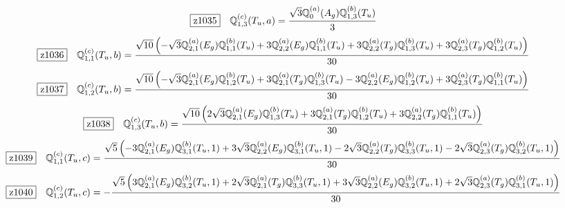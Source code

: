 \documentclass[fleqn,10pt,landscape]{jsarticle}
\begin{document}
\begin{dmath*}
\hspace*{3mm}\fbox{z1035}\quad \mathbb{Q}_{1,3}^{(c)}(T_{u},a)=\frac{\sqrt{3} \mathbb{Q}_{0}^{(a)}(A_{g}) \mathbb{Q}_{1,3}^{(b)}(T_{u})}{3}
\end{dmath*}
\begin{dmath*}
\hspace*{3mm}\fbox{z1036}\quad \mathbb{Q}_{1,1}^{(c)}(T_{u},b)=\frac{\sqrt{10} \left(- \sqrt{3} \mathbb{Q}_{2,1}^{(a)}(E_{g}) \mathbb{Q}_{1,1}^{(b)}(T_{u}) + 3 \mathbb{Q}_{2,2}^{(a)}(E_{g}) \mathbb{Q}_{1,1}^{(b)}(T_{u}) + 3 \mathbb{Q}_{2,2}^{(a)}(T_{g}) \mathbb{Q}_{1,3}^{(b)}(T_{u}) + 3 \mathbb{Q}_{2,3}^{(a)}(T_{g}) \mathbb{Q}_{1,2}^{(b)}(T_{u})\right)}{30}
\end{dmath*}
\begin{dmath*}
\hspace*{3mm}\fbox{z1037}\quad \mathbb{Q}_{1,2}^{(c)}(T_{u},b)=\frac{\sqrt{10} \left(- \sqrt{3} \mathbb{Q}_{2,1}^{(a)}(E_{g}) \mathbb{Q}_{1,2}^{(b)}(T_{u}) + 3 \mathbb{Q}_{2,1}^{(a)}(T_{g}) \mathbb{Q}_{1,3}^{(b)}(T_{u}) - 3 \mathbb{Q}_{2,2}^{(a)}(E_{g}) \mathbb{Q}_{1,2}^{(b)}(T_{u}) + 3 \mathbb{Q}_{2,3}^{(a)}(T_{g}) \mathbb{Q}_{1,1}^{(b)}(T_{u})\right)}{30}
\end{dmath*}
\begin{dmath*}
\hspace*{3mm}\fbox{z1038}\quad \mathbb{Q}_{1,3}^{(c)}(T_{u},b)=\frac{\sqrt{10} \left(2 \sqrt{3} \mathbb{Q}_{2,1}^{(a)}(E_{g}) \mathbb{Q}_{1,3}^{(b)}(T_{u}) + 3 \mathbb{Q}_{2,1}^{(a)}(T_{g}) \mathbb{Q}_{1,2}^{(b)}(T_{u}) + 3 \mathbb{Q}_{2,2}^{(a)}(T_{g}) \mathbb{Q}_{1,1}^{(b)}(T_{u})\right)}{30}
\end{dmath*}
\begin{dmath*}
\hspace*{3mm}\fbox{z1039}\quad \mathbb{Q}_{1,1}^{(c)}(T_{u},c)=\frac{\sqrt{5} \left(- 3 \mathbb{Q}_{2,1}^{(a)}(E_{g}) \mathbb{Q}_{3,1}^{(b)}(T_{u},1) + 3 \sqrt{3} \mathbb{Q}_{2,2}^{(a)}(E_{g}) \mathbb{Q}_{3,1}^{(b)}(T_{u},1) - 2 \sqrt{3} \mathbb{Q}_{2,2}^{(a)}(T_{g}) \mathbb{Q}_{3,3}^{(b)}(T_{u},1) - 2 \sqrt{3} \mathbb{Q}_{2,3}^{(a)}(T_{g}) \mathbb{Q}_{3,2}^{(b)}(T_{u},1)\right)}{30}
\end{dmath*}
\begin{dmath*}
\hspace*{3mm}\fbox{z1040}\quad \mathbb{Q}_{1,2}^{(c)}(T_{u},c)=- \frac{\sqrt{5} \left(3 \mathbb{Q}_{2,1}^{(a)}(E_{g}) \mathbb{Q}_{3,2}^{(b)}(T_{u},1) + 2 \sqrt{3} \mathbb{Q}_{2,1}^{(a)}(T_{g}) \mathbb{Q}_{3,3}^{(b)}(T_{u},1) + 3 \sqrt{3} \mathbb{Q}_{2,2}^{(a)}(E_{g}) \mathbb{Q}_{3,2}^{(b)}(T_{u},1) + 2 \sqrt{3} \mathbb{Q}_{2,3}^{(a)}(T_{g}) \mathbb{Q}_{3,1}^{(b)}(T_{u},1)\right)}{30}
\end{dmath*}
\end{document}
